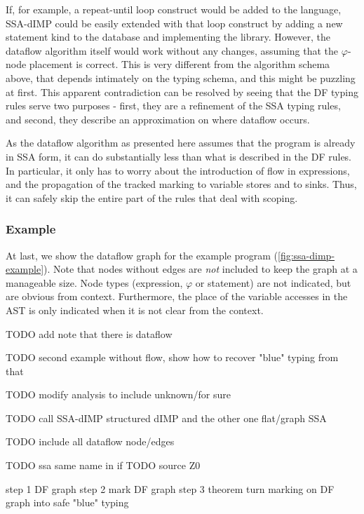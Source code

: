If, for example, a repeat-until loop construct would be added to the language,
SSA-dIMP could be easily extended with that loop construct by adding a new statement 
kind to the database and implementing the library.
However, the dataflow algorithm itself would work without any changes, assuming that
the $\varphi$-node placement is correct.
This is very different from the algorithm schema above, that depends intimately on the 
typing schema, and this might be puzzling at first.
This apparent contradiction can be resolved by seeing that the DF typing 
rules serve two purposes - first, they are a refinement of the SSA typing rules,
and second, they describe an approximation on where dataflow occurs.

As the dataflow algorithm as presented here assumes that the program is already in 
SSA form, it can do substantially less than what is described in the DF rules.
In particular, it only has to worry about the introduction of flow in expressions,
and the propagation of the tracked marking to variable stores and to sinks.
Thus, it can safely skip the entire part of the rules that deal with scoping.

\subsubsection*{Example}
At last, we show the dataflow graph for the example program (\autoref{fig:ssa-dimp-example}).
Note that nodes without edges are \emph{not} included to keep the graph at a manageable size.
Node types (expression, $\varphi$ or statement) are not indicated, but are obvious from context.
Furthermore, the place of the variable accesses in the AST is only indicated when it is 
not clear from the context.

TODO add note that there is dataflow

TODO second example without flow, show how to recover "blue" typing from that

TODO modify analysis to include unknown/for sure 

TODO call SSA-dIMP structured dIMP and the other one flat/graph SSA

TODO include all dataflow node/edges

TODO ssa same name in if 
TODO source Z0

step 1 DF graph step 2 mark DF graph step 3 theorem turn marking on DF graph into safe "blue" typing

